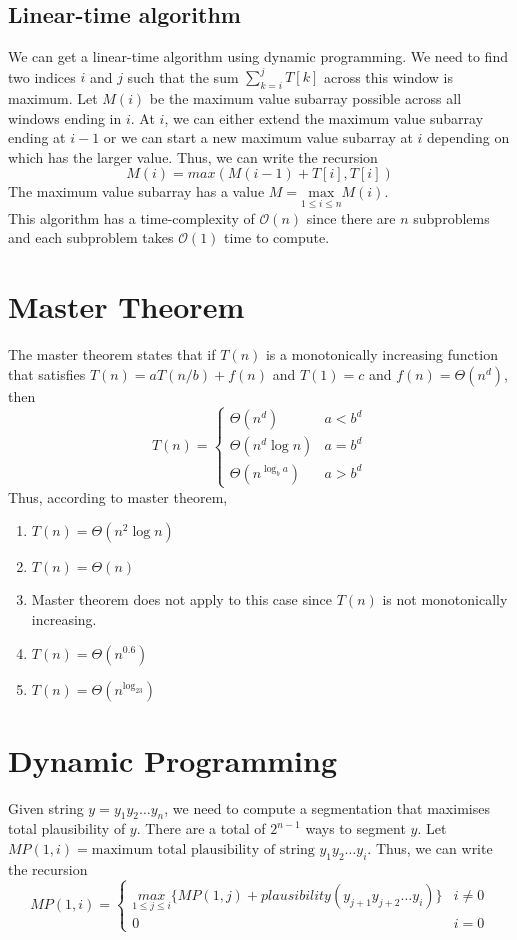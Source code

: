 \documentclass[10pt,a4paper]{article}
\begin{document}
\subsection{Linear-time algorithm}
We can get a linear-time algorithm using dynamic programming. We need to find two indices $i$ and $j$ such that the sum $\sum_{k=i}^{j} T[k]$ across this window is maximum. Let $M(i)$ be the maximum value subarray possible across all windows ending in $i$. At $i$, we can either extend the maximum value subarray ending at $i-1$ or we can start a new maximum value subarray at $i$ depending on which has the larger value. Thus, we can write the recursion
$$M(i) = max(M(i-1) + T[i], T[i])$$
The maximum value subarray has a value $M = \underset{1\leq i \leq n}{\text{max}} M(i)$. \\
This algorithm has a time-complexity of $\mathcal{O}(n)$ since there are $n$ subproblems and each subproblem takes $\mathcal{O}(1)$ time to compute.

\section{Master Theorem}
The master theorem states that if $T(n)$ is a monotonically increasing function that satisfies $T(n) = aT(n/b) + f(n)$ and $T(1) = c$ and $f(n) = \Theta(n^d)$, then
$$T(n) = \begin{cases} 
      \Theta(n^d) & a < b^d \\
      \Theta(n^d\log n) & a = b^d \\
      \Theta(n^{\log_ba}) & a > b^d 
   \end{cases}
$$
Thus, according to master theorem,
\begin{enumerate}
\item $T(n) = \Theta(n^2\log n)$
\item $T(n) = \Theta(n)$
\item Master theorem does not apply to this case since $T(n)$ is not monotonically increasing.
\item $T(n) = \Theta(n^{0.6})$
\item $T(n) = \Theta(n^{\log_23})$ 
\end{enumerate}

\section{Dynamic Programming}
Given string $y = y_1y_2\ldots y_n$, we need to compute a segmentation that maximises total plausibility of $y$. There are a total of $2^{n-1}$ ways to segment $y$. Let $MP(1, i) = \text{maximum total plausibility of string }y_1y_2\ldots y_i$. Thus, we can write the recursion
$$MP(1, i) = \begin{cases} 
      \underset{1 \leq j \leq i}{max} \big\{ MP(1, j) + plausibility(y_{j+1}y_{j+2}\ldots y_i) \big\} & i\neq 0 \\
      0 & i=0
   \end{cases}
$$
\end{document}

